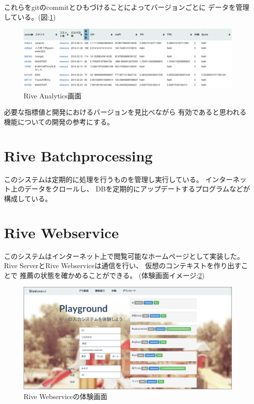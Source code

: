 これらをgitのcommitとひもづけることによってバージョンごとに
データを管理している。(図:\ref{fig:riveanalytics})
\begin{figure}[htbp]
  \begin{center}
    \includegraphics[width=170mm,bb=0 0 952 274]{images/riveanalytics.png}
    \caption{Rive Analytics画面}
    \label{fig:riveanalytics}
  \end{center}
\end{figure}
必要な指標値と開発におけるバージョンを見比べながら
有効であると思われる機能についての開発の参考にする。

\section{Rive Batchprocessing}
このシステムは定期的に処理を行うものを管理し実行している。
インターネット上のデータをクロールし、
DBを定期的にアップデートするプログラムなどが構成している。

\section{Rive Webservice}
このシステムはインターネット上で閲覧可能なホームページとして実装した。
Rive ServerとRive Webserviceは通信を行い、
仮想のコンテキストを作り出すことで
推薦の状態を確かめることができる。
(体験画面イメージ:\ref{fig:rivewebservice})
\begin{figure}[htbp]
  \begin{center}
    \includegraphics[width=160mm,bb=0 0 1349 662]{images/rivewebservice.png}
    \caption{Rive Webserviceの体験画面}
    \label{fig:rivewebservice}
  \end{center}
\end{figure}


